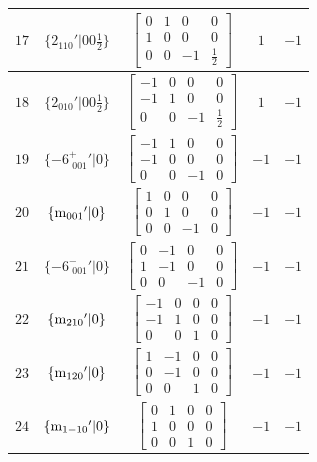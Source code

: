 \documentclass[fleqn,8pt]{jsarticle}
\begin{document}
\begin{longtable}{ccccc}
$ 17 $ & $ \{2{}_{110}{}'|0 0 \frac{1}{2}\} $ & $ \begin{bmatrix} 0 & 1 & 0 & 0 \\ 1 & 0 & 0 & 0 \\ 0 & 0 & -1 & \frac{1}{2} \end{bmatrix} $ & $ 1 $ & $ -1 $ \\ \hline
$ 18 $ & $ \{2{}_{010}{}'|0 0 \frac{1}{2}\} $ & $ \begin{bmatrix} -1 & 0 & 0 & 0 \\ -1 & 1 & 0 & 0 \\ 0 & 0 & -1 & \frac{1}{2} \end{bmatrix} $ & $ 1 $ & $ -1 $ \\ \hline
$ 19 $ & $ \{-6^{+}_{\,\,001}{}'|0\} $ & $ \begin{bmatrix} -1 & 1 & 0 & 0 \\ -1 & 0 & 0 & 0 \\ 0 & 0 & -1 & 0 \end{bmatrix} $ & $ -1 $ & $ -1 $ \\ \hline
$ 20 $ & $ \{{\rm m}_{001}{}'|0\} $ & $ \begin{bmatrix} 1 & 0 & 0 & 0 \\ 0 & 1 & 0 & 0 \\ 0 & 0 & -1 & 0 \end{bmatrix} $ & $ -1 $ & $ -1 $ \\ \hline
$ 21 $ & $ \{-6^{-}_{\,\,001}{}'|0\} $ & $ \begin{bmatrix} 0 & -1 & 0 & 0 \\ 1 & -1 & 0 & 0 \\ 0 & 0 & -1 & 0 \end{bmatrix} $ & $ -1 $ & $ -1 $ \\ \hline
$ 22 $ & $ \{{\rm m}_{210}{}'|0\} $ & $ \begin{bmatrix} -1 & 0 & 0 & 0 \\ -1 & 1 & 0 & 0 \\ 0 & 0 & 1 & 0 \end{bmatrix} $ & $ -1 $ & $ -1 $ \\ \hline
$ 23 $ & $ \{{\rm m}_{120}{}'|0\} $ & $ \begin{bmatrix} 1 & -1 & 0 & 0 \\ 0 & -1 & 0 & 0 \\ 0 & 0 & 1 & 0 \end{bmatrix} $ & $ -1 $ & $ -1 $ \\ \hline
$ 24 $ & $ \{{\rm m}_{1-10}{}'|0\} $ & $ \begin{bmatrix} 0 & 1 & 0 & 0 \\ 1 & 0 & 0 & 0 \\ 0 & 0 & 1 & 0 \end{bmatrix} $ & $ -1 $ & $ -1 $ \\
\end{longtable}
\end{document}
